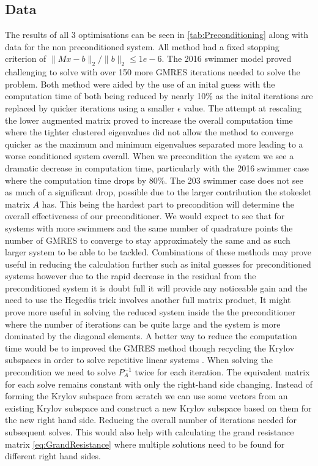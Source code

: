 \subsection{Data}
The results of all 3 optimisations can be seen in \cref{tab:Preconditioning} along with data for the non preconditioned system. All method had a fixed stopping criterion of $\lVert Mx-b \rVert_2/\lVert b \rVert_2 \leq 1e-6$. The 2016 swimmer model proved challenging to solve with over 150 more GMRES iterations needed to solve the problem. Both method were aided by the use of an inital guess with the computation time of both being reduced by nearly 10\% as the inital iterations are replaced by quicker iterations using a smaller $\epsilon$ value. The attempt at rescaling the lower augmented matrix proved to increase the overall computation time where the tighter clustered eigenvalues did not allow the method to converge quicker as the maximum and minimum eigenvalues separated more leading to a worse conditioned system overall. When we precondition the system we see a dramatic decrease in computation time, particularly with the 2016 swimmer case where the computation time drops by 80\%. The 203 swimmer case does not see as much of a significant drop, possible due to the larger contribution the stokeslet matrix $A$ has. This being the hardest part to precondition will determine the overall effectiveness of our preconditioner. We would expect to see that for systems with more swimmers and the same number of quadrature points the number of GMRES to converge to stay approximately the same and as such larger system to be able to be tackled. Combinations of these methods may prove useful in reducing the calculation further such as inital guesses for preconditioned systems however due to the rapid decrease in the residual from the preconditioned system it is doubt full it will provide any noticeable gain and the need to use the Heged{\"u}s trick involves another full matrix product, It might prove more useful in solving the reduced system inside the the preconditioner where the number of iterations can be quite large and the system is more dominated by the diagonal elements. A better way to reduce the computation time would be to improved the GMRES method though recycling the Krylov subspaces in order to solve repetitive linear systems \cite{Parks2006RecyclingSystems,Rostami2019FastBiofluids}. When solving the precondition we need to solve $P_A^{-1}$ twice for each iteration. The equivalent matrix for each solve remains constant with only the right-hand side changing. Instead of forming the Krylov subspace from scratch we can use some vectors from an existing Krylov subspace and construct a new Krylov subspace based on them for the new right hand side. Reducing the overall number of iterations needed for subsequent solves. This would also help with calculating the grand resistance matrix \cref{eq:GrandResistance} where multiple solutions need to be found for different right hand sides.

